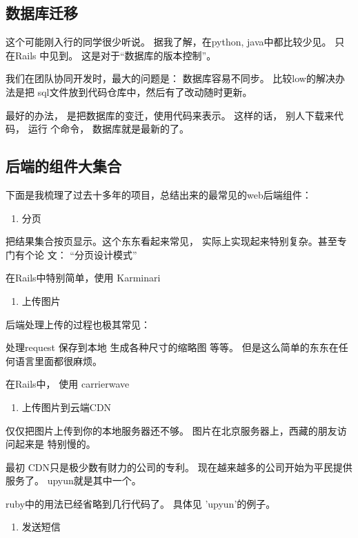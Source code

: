 \documentclass[11pt]{ctexart}
\begin{document}
{{{{\subsection{数据库迁移}
\label{sec:org9210153}
这个可能刚入行的同学很少听说。 据我了解，在python, java中都比较少见。 只在Rails
中见到。 这是对于“数据库的版本控制”。


我们在团队协同开发时，最大的问题是： 数据库容易不同步。 比较low的解决办法是把
sql文件放到代码仓库中，然后有了改动随时更新。


最好的办法， 是把数据库的变迁，使用代码来表示。 这样的话， 别人下载来代码， 运行
个命令， 数据库就是最新的了。


\subsection{后端的组件大集合}
\label{sec:org6f3d985}
下面是我梳理了过去十多年的项目，总结出来的最常见的web后端组件：

\begin{enumerate}
\item 分页
\end{enumerate}

把结果集合按页显示。这个东东看起来常见， 实际上实现起来特别复杂。甚至专门有个论
文： “分页设计模式”


在Rails中特别简单，使用 Karminari

\begin{enumerate}
\item 上传图片
\end{enumerate}

后端处理上传的过程也极其常见：

处理request
保存到本地
生成各种尺寸的缩略图
等等。
但是这么简单的东东在任何语言里面都很麻烦。

在Rails中， 使用 carrierwave

\begin{enumerate}
\item 上传图片到云端CDN
\end{enumerate}

仅仅把图片上传到你的本地服务器还不够。 图片在北京服务器上，西藏的朋友访问起来是
特别慢的。


最初 CDN只是极少数有财力的公司的专利。 现在越来越多的公司开始为平民提供服务了。
upyun就是其中一个。


ruby中的用法已经省略到几行代码了。 具体见 'upyun'的例子。

\begin{enumerate}
\item 发送短信
\end{enumerate}

}}}}
\end{document}
